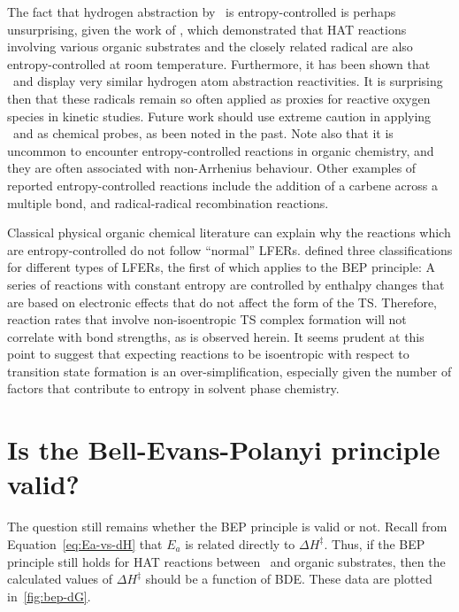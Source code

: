 The fact that hydrogen abstraction by \cumo\ is entropy-controlled is perhaps
unsurprising, given the work of \citet{Finn2004}, which demonstrated that HAT
reactions involving various organic substrates and the closely related radical
 are also entropy-controlled at room temperature. Furthermore, it
has been shown that \cumo\ and  display very similar hydrogen
atom abstraction reactivities.\cite{Salamone2011, Valgimigli1995, Sheeller2001,
Baignee1983} It is surprising then that these radicals remain so often applied
as proxies for reactive oxygen species in kinetic studies. Future work should
use extreme caution in applying \cumo\ and  as chemical probes,
as been noted in the past.\cite{Finn2004, Salamone2011b, Salamone2011} Note
also that it is uncommon to encounter entropy-controlled reactions in organic
chemistry, and they are often associated with non-Arrhenius behaviour. Other
examples of reported entropy-controlled reactions include the addition of a
carbene across a multiple bond,\cite{Houk1984, Moss2017} and radical-radical
recombination reactions.\cite{Sobek2001}

Classical physical organic chemical literature can explain why the reactions
which are entropy-controlled do not follow ``normal'' LFERs.\cite{Exner1973}
\citet{Blackadder1958} defined three classifications for different types of
LFERs, the first of which applies to the BEP principle: A series of reactions
with constant entropy are controlled by enthalpy changes that are based on
electronic effects that do not affect the form of the TS. Therefore, reaction
rates that involve non-isoentropic TS complex formation will not correlate with
bond strengths, as is observed herein. It seems prudent at this point to
suggest that expecting reactions to be isoentropic with respect to transition
state formation is an over-simplification, especially given the number of
factors that contribute to entropy in solvent phase chemistry.

\section{Is the Bell-Evans-Polanyi principle valid?}

The question still remains whether the BEP principle is valid or not. Recall
from Equation~\ref{eq:Ea-vs-dH} that $E_a$ is related directly to $\Delta
H^\ddagger$. Thus, if the BEP principle still holds for HAT reactions between
\cumo\ and organic substrates, then the calculated values of $\Delta
H^\ddagger$ should be a function of  BDE. These data are plotted
in~\ref{fig:bep-dG}.

